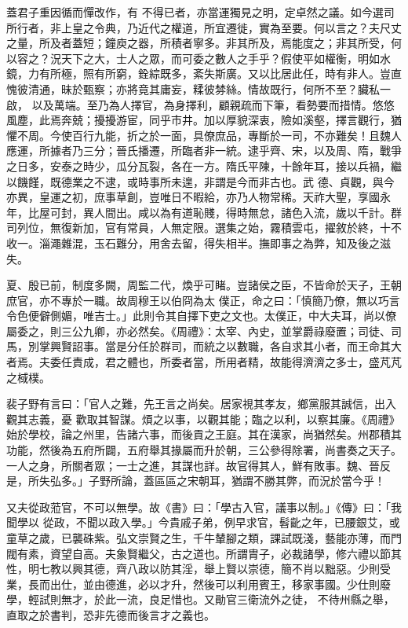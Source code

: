 \begin{pinyinscope}
 蓋君子重因循而憚改作，有
 不得已者，亦當運獨見之明，定卓然之議。如今選司所行者，非上皇之令典，乃近代之權道，所宜遷徙，實為至要。何以言之？夫尺丈之量，所及者蓋短；鐘庾之器，所積者寧多。非其所及，焉能度之；非其所受，何以容之？況天下之大，士人之眾，而可委之數人之手乎？假使平如權衡，明如水鏡，力有所極，照有所窮，銓綜既多，紊失斯廣。又以比居此任，時有非人。豈直愧彼清通，昧於甄察；亦將竟其庸妄，糅彼棼絲。情故既行，何所不至？臟私一啟，
 以及萬端。至乃為人擇官，為身擇利，顧親疏而下筆，看勢要而措情。悠悠風塵，此焉奔兢；擾擾游宦，同乎市井。加以厚貌深衷，險如溪壑，擇言觀行，猶懼不周。今使百行九能，折之於一面，具僚庶品，專斷於一司，不亦難矣！且魏人應運，所據者乃三分；晉氏播遷，所臨者非一統。逮乎齊、宋，以及周、隋，戰爭之日多，安泰之時少，瓜分瓦裂，各在一方。隋氏平陳，十餘年耳，接以兵禍，繼以饑饉，既德業之不逮，或時事所未遑，非謂是今而非古也。武
 德、貞觀，與今亦異，皇運之初，庶事草創，豈唯日不暇給，亦乃人物常稀。天祚大聖，享國永年，比屋可封，異人間出。咸以為有道恥賤，得時無怠，諸色入流，歲以千計。群司列位，無復新加，官有常員，人無定限。選集之始，霧積雲屯，擢敘於終，十不收一。淄澠雜混，玉石難分，用舍去留，得失相半。撫即事之為弊，知及後之滋失。



 夏、殷已前，制度多闕，周監二代，煥乎可睹。豈諸侯之臣，不皆命於天子，王朝庶官，亦不專於一職。故周穆王以伯冏為太
 僕正，命之曰：「慎簡乃僚，無以巧言令色便僻側媚，唯吉士。」此則令其自擇下吏之文也。太僕正，中大夫耳，尚以僚屬委之，則三公九卿，亦必然矣。《周禮》：太宰、內史，並掌爵祿廢置；司徒、司馬，別掌興賢詔事。當是分任於群司，而統之以數職，各自求其小者，而王命其大者焉。夫委任責成，君之體也，所委者當，所用者精，故能得濟濟之多士，盛芃芃之棫樸。



 裴子野有言曰：「官人之難，先王言之尚矣。居家視其孝友，鄉黨服其誠信，出入觀其志義，憂
 歡取其智謀。煩之以事，以觀其能；臨之以利，以察其廉。《周禮》始於學校，論之州里，告諸六事，而後貢之王庭。其在漢家，尚猶然矣。州郡積其功能，然後為五府所闢，五府舉其掾屬而升於朝，三公參得除署，尚書奏之天子。一人之身，所關者眾；一士之進，其謀也詳。故官得其人，鮮有敗事。魏、晉反是，所失弘多。」子野所論，蓋區區之宋朝耳，猶謂不勝其弊，而況於當今乎！



 又夫從政蒞官，不可以無學。故《書》曰：「學古入官，議事以制。」《傳》曰：「我聞學以
 從政，不聞以政入學。」今貴戚子弟，例早求官，髫齔之年，已腰銀艾，或童草之歲，已襲硃紫。弘文崇賢之生，千牛輦腳之類，課試既淺，藝能亦薄，而門閥有素，資望自高。夫象賢繼父，古之道也。所謂胄子，必裁諸學，修六禮以節其性，明七教以興其德，齊八政以防其淫，舉上賢以崇德，簡不肖以黜惡。少則受業，長而出仕，並由德進，必以才升，然後可以利用賓王，移家事國。少仕則廢學，輕試則無才，於此一流，良足惜也。又勛官三衛流外之徒，
 不待州縣之舉，直取之於書判，恐非先德而後言才之義也。




\end{pinyinscope}
